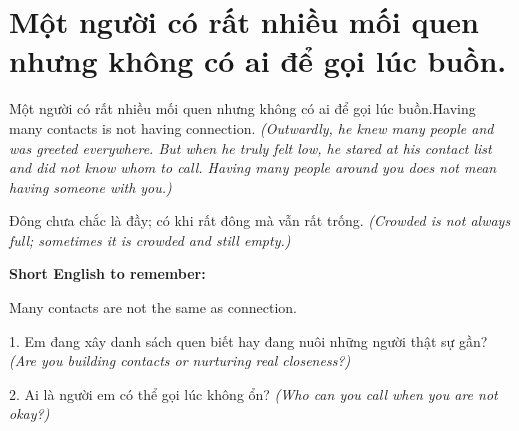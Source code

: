 \section{Một người có rất nhiều mối quen nhưng không có ai để gọi lúc buồn.}
\begin{truyen}{Một người có rất nhiều mối quen nhưng không có ai để gọi lúc buồn.}{Having many contacts is not having connection.}
\textit{(Outwardly, he knew many people and was greeted everywhere. But when he truly felt low, he stared at his contact list and did not know whom to call. Having many people around you does not mean having someone with you.)}
\end{truyen}
\begin{baihoc}
Đông chưa chắc là đầy; có khi rất đông mà vẫn rất trống.
\textit{(Crowded is not always full; sometimes it is crowded and still empty.)}
\end{baihoc}
\begin{ghinhoanh}
\textbf{Short English to remember:}

Many contacts are not the same as connection.
\end{ghinhoanh}
\begin{tuhocnhanh}
1. Em đang xây danh sách quen biết hay đang nuôi những người thật sự gần? \textit{(Are you building contacts or nurturing real closeness?)}

2. Ai là người em có thể gọi lúc không ổn? \textit{(Who can you call when you are not okay?)}
\end{tuhocnhanh}
\ngancach

